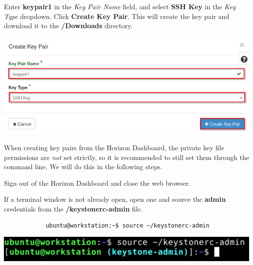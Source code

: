 \documentclass[letterpaper, 12pt]{article}
\begin{document}
\begin{enumerate}
    \begin{labstep}
        Enter \textbf{keypair1} in the \textit{Key Pair Name} field, and select \textbf{SSH Key} in the \textit{Key Type} dropdown.
        Click \textbf{Create Key Pair}.
        This will create the key pair and download it to the \textbf{\texttildemid/Downloads} directory.

        \begin{center}
            \includegraphics[width=\linewidth]{images/part3/step3.png}
        \end{center}
    \end{labstep}

    \begin{tipbox}
        When creating key pairs from the Horizon Dashboard, the private key file permissions are \textit{not} set strictly, so it is recommended to still set them through the command line.
        We will do this in the following steps.
    \end{tipbox}

    \begin{labstep}
        Sign out of the Horizon Dashboard and close the web browser.
    \end{labstep}

    \begin{labstep}
        If a terminal window is not already open, open one and source the \textbf{admin} credentials from the \textbf{\texttildemid/keystonerc-admin} file.
        \begin{lstlisting}
            ubuntu@workstation:~$ source ~/keystonerc-admin
        \end{lstlisting}

        \begin{center}
            \includegraphics[width=\linewidth]{images/part3/step5.png}
        \end{center}
    \end{labstep}


\end{enumerate}
\end{document}
